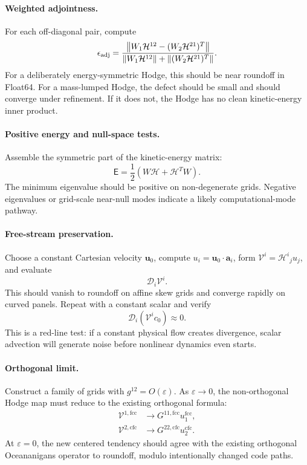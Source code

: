\documentclass[11pt]{article}
\newcommand{\bvec}[1]{\bm{#1}}
\newcommand{\mc}[1]{\mathcal{#1}}
\newcommand{\msf}[1]{\mathsf{#1}}
\newcommand{\Div}{\mc{D}}
\newcommand{\Hodge}{\mc{H}}
\newcommand{\Vflux}{\mc{V}}
\newcommand{\eps}{\varepsilon}
\newcommand{\loc}[1]{^{\mathrm{#1}}}
\begin{document}
\paragraph{Weighted adjointness.}
For each off-diagonal pair, compute
\begin{equation}
  \epsilon_{\rm adj}
  =
  \frac{
  \left\|W_1\Hodge^{12}-(W_2\Hodge^{21})^T\right\|
  }{
  \left\|W_1\Hodge^{12}\right\|+
  \left\|(W_2\Hodge^{21})^T\right\|
  }.
  \label{eq:adjointness-defect}
\end{equation}
For a deliberately energy-symmetric Hodge, this should be near roundoff in Float64.  For a mass-lumped Hodge, the defect should be small and should converge under refinement.  If it does not, the Hodge has no clean kinetic-energy inner product.

\paragraph{Positive energy and null-space tests.}
Assemble the symmetric part of the kinetic-energy matrix:
\begin{equation}
  \msf{E}
  =
  \frac12\left(W\Hodge+\Hodge^T W\right).
\end{equation}
The minimum eigenvalue should be positive on non-degenerate grids.  Negative eigenvalues or grid-scale near-null modes indicate a likely computational-mode pathway.

\paragraph{Free-stream preservation.}
Choose a constant Cartesian velocity \(\bvec{u}_0\), compute \(u_i=\bvec{u}_0\cdot\bvec{a}_i\), form \(\Vflux^i=\Hodge^i{}_j u_j\), and evaluate
\begin{equation}
  \Div_i\Vflux^i.
\end{equation}
This should vanish to roundoff on affine skew grids and converge rapidly on curved panels.  Repeat with a constant scalar and verify
\begin{equation}
  \Div_i(\Vflux^i c_0)\approx0.
\end{equation}
This is a red-line test: if a constant physical flow creates divergence, scalar advection will generate noise before nonlinear dynamics even starts.

\paragraph{Orthogonal limit.}
Construct a family of grids with \(g^{12}=O(\eps)\).  As \(\eps\to0\), the non-orthogonal Hodge map must reduce to the existing orthogonal formula:
\begin{align}
  \Vflux^{1,\mathrm{fcc}} &\to G^{11,\mathrm{fcc}}u_1\loc{fcc}, \\
  \Vflux^{2,\mathrm{cfc}} &\to G^{22,\mathrm{cfc}}u_2\loc{cfc}.
\end{align}
At \(\eps=0\), the new centered tendency should agree with the existing orthogonal Oceananigans operator to roundoff, modulo intentionally changed code paths.
\end{document}
